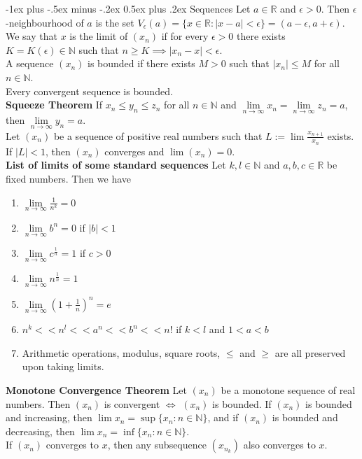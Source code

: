 \documentclass[10pt,landscape]{article}
\makeatletter
\renewcommand{\section}{\@startsection{section}{1}{0mm}%
                                {-1ex plus -.5ex minus -.2ex}%
                                {0.5ex plus .2ex}%
                                {\normalfont\large\bfseries}}
\makeatother
\begin{document}
\begin{multicols}{3}
\section{Sequences}
Let $a\in\mathbb{R}$ and  $\epsilon>0$. Then  $\epsilon$-neighbourhood of  $a$ is the set  $V_\epsilon(a)=\{x\in\mathbb{R}:|x-a|<\epsilon\}=(a-\epsilon,a+\epsilon)$.\\
We say that $x$ is the limit of $(x_n)$ if for every $\epsilon>0$ there exists  $K=K(\epsilon)\in\mathbb{N}$ such that  $n\geq K \implies |x_n-x|<\epsilon$.\\
A sequence  $(x_n)$ is bounded if there exists  $M>0$ such that  $|x_n|\leq M$ for all  $n\in\mathbb{N}$.\\
Every convergent sequence is bounded.\\
\textbf{Squeeze Theorem} If  $x_n\leq y_n\leq z_n$ for all  $n\in\mathbb{N}$ and  $\lim\limits_{n\to\infty}x_n=\lim\limits_{n\to\infty}z_n=a$, then  $\lim\limits_{n\to\infty}y_n=a$.\\
Let $(x_n)$ be a sequence of positive real numbers such that $L:=\lim\frac{x_{n+1}}{x_n}$ exists. If $|L|<1$, then  $(x_n)$ converges and  $\lim(x_n)=0$.\\
\textbf{List of limits of some standard sequences} Let $k,l\in\mathbb{N}$ and  $a,b,c\in\mathbb{R}$ be fixed numbers. Then we have
 \begin{enumerate}
	 \item $\lim\limits_{n\to\infty}\frac{1}{n^k}=0$
	 \item $\lim\limits_{n\to\infty}b^n=0$ if $|b|<1$
	 \item $\lim\limits_{n\to\infty}c^{\frac{1}{n}}=1$ if $c>0$
	 \item  $\lim\limits_{n\to\infty}n^{\frac{1}{n}}=1$ 
	 \item $\lim\limits_{n\to\infty}\left(1+\frac{1}{n}\right)^n=e$ 
	\item $n^k<<n^l<<a^n<<b^n<<n!$ if  $k<l$ and  $1<a<b$
	\item Arithmetic operations, modulus, square roots,  $\leq$ and  $\geq$ are all preserved upon taking limits.
 \end{enumerate}
 \textbf{Monotone Convergence Theorem} Let $(x_n)$ be a monotone sequence of real numbers. Then  $(x_n)$ is convergent  $\iff$  $(x_n)$ is bounded. If  $(x_n)$ is bounded and increasing, then  $\lim x_n=\sup\{x_n:n\in\mathbb{N}\}$, and if  $(x_n)$ is bounded and decreasing, then  $\lim x_n=\inf\{x_n:n\in\mathbb{N}\}$.\\
 If $(x_n)$ converges to  $x$, then any subsequence  $(x_{n_k})$ also converges to  $x$.\\

\end{multicols}
\end{document}
